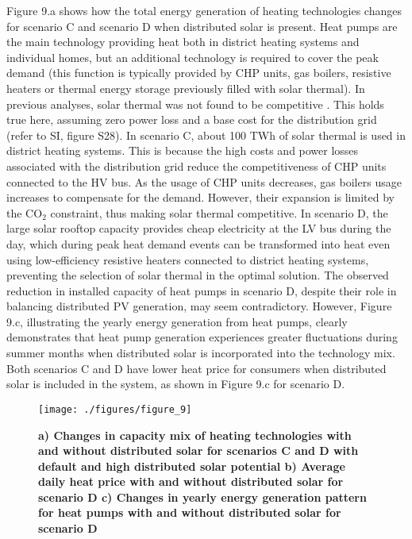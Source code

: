 \documentclass[review]{elsarticle}
\begin{document}
Figure 9.a shows how the total energy generation of heating technologies changes for scenario C and scenario D when distributed solar is present. Heat pumps are the main technology providing heat both in district heating systems and individual homes, but an additional technology is required to cover the peak demand (this function is typically provided by CHP units, gas boilers, resistive heaters or thermal energy storage previously filled with solar thermal).  In previous analyses, solar thermal was not found to be competitive \cite{victoria_2022, zeyen2021mitigating}. This holds true here, assuming zero power loss and a base cost for the distribution grid (refer to SI, figure S28). 
In scenario C, about 100 TWh of solar thermal is used in district heating systems. This is because the high costs and power losses associated with the distribution grid reduce the competitiveness of CHP units connected to the HV bus. As the usage of CHP units decreases, gas boilers usage increases to compensate for the demand. However, their expansion is limited by the $\mathrm{CO_2}$ constraint, thus making solar thermal competitive. 
In scenario D, the large solar rooftop capacity provides cheap electricity at the LV bus during the day, which during peak heat demand events can be transformed into heat even using low-efficiency resistive heaters connected to district heating systems, preventing the selection of solar thermal in the optimal solution. The observed reduction in installed capacity of heat pumps in scenario D, despite their role in balancing distributed PV generation, may seem contradictory. However, Figure 9.c, illustrating the yearly energy generation from heat pumps, clearly demonstrates that heat pump generation experiences greater fluctuations during summer months when distributed solar is incorporated into the technology mix.
Both scenarios C and D have lower heat price for consumers when distributed solar is included in the system, as shown in Figure 9.c for scenario D. 

\begin{figure}
   \texttt{[image: ./figures/figure\_9]}
   \caption{\textbf{a) Changes in capacity mix of heating technologies with and without distributed solar for scenarios C and D with default and high distributed solar potential b) Average daily heat price with and without distributed solar for scenario D c) Changes in yearly energy generation pattern for heat pumps with and without distributed solar for scenario D }}
   \label{fig:heat}
\end{figure}
\end{document}

